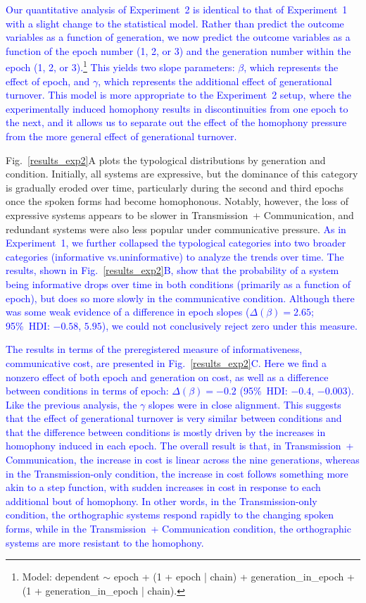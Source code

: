 \documentclass[doc,biblatex]{apa7}
\newcommand\newmaterial[1]{\textcolor{blue}{#1}}
\begin{document}
\newmaterial{Our quantitative analysis of Experiment~2 is identical to that of Experiment~1 with a slight change to the statistical model. Rather than predict the outcome variables as a function of generation, we now predict the outcome variables as a function of the epoch number (1, 2, or 3) and the generation number within the epoch (1, 2, or 3).\footnote{Model: dependent $\sim$ epoch + (1 + epoch | chain) + generation\_in\_epoch + (1 + generation\_in\_epoch | chain).} This yields two slope parameters: $\beta$, which represents the effect of epoch, and $\gamma$, which represents the additional effect of generational turnover. This model is more appropriate to the Experiment~2 setup, where the experimentally induced homophony results in discontinuities from one epoch to the next, and it allows us to separate out the effect of the homophony pressure from the more general effect of generational turnover.}

Fig.~\ref{results_exp2}A plots the typological distributions by generation and condition. Initially, all systems are expressive, but the dominance of this category is gradually eroded over time, particularly during the second and third epochs once the spoken forms had become homophonous. Notably, however, the loss of expressive systems appears to be slower in Transmission~+ Communication, and redundant systems were also less popular under communicative pressure. \newmaterial{As in Experiment~1, we further collapsed the typological categories into two broader categories (informative vs.\@ uninformative) to analyze the trends over time. The results, shown in Fig.~\ref{results_exp2}B, show that the probability of a system being informative drops over time in both conditions (primarily as a function of epoch), but does so more slowly in the communicative condition. Although there was some weak evidence of a difference in epoch slopes ($\Delta(\beta) = 2.65$; 95\%~HDI: $-0.58$, $5.95$), we could not conclusively reject zero under this measure.}

\newmaterial{The results in terms of the preregistered measure of informativeness, communicative cost, are presented in Fig.~\ref{results_exp2}C. Here we find a nonzero effect of both epoch and generation on cost, as well as a difference between conditions in terms of epoch: $\Delta(\beta) = -0.2$ (95\%~HDI: $-0.4$, $-0.003$). Like the previous analysis, the $\gamma$ slopes were in close alignment. This suggests that the effect of generational turnover is very similar between conditions and that the difference between conditions is mostly driven by the increases in homophony induced in each epoch. The overall result is that, in Transmission~+ Communication, the increase in cost is linear across the nine generations, whereas in the Transmission-only condition, the increase in cost follows something more akin to a step function, with sudden increases in cost in response to each additional bout of homophony. In other words, in the Transmission-only condition, the orthographic systems respond rapidly to the changing spoken forms, while in the Transmission~+ Communication condition, the orthographic systems are more resistant to the homophony.}
\end{document}
